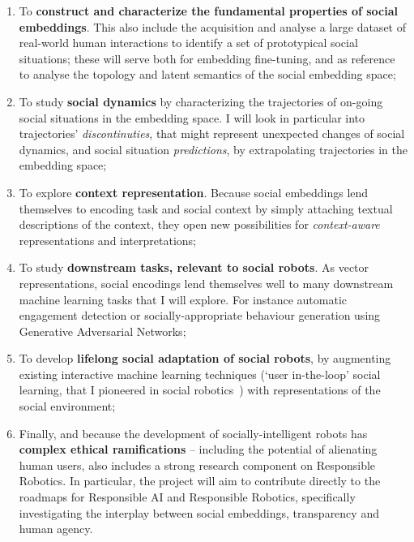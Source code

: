 \begin{enumerate}[label=\textbf{O\arabic*}]
    \item \label{T1} To \textbf{construct and characterize the fundamental
        properties of social embeddings}. This also include the acquisition and
        analyse a large dataset of real-world human interactions to identify a
        set of prototypical social situations; these will serve both for
        embedding fine-tuning, and as reference to analyse the topology and
        latent semantics of the social embedding space;

    \item \label{T2} To study \textbf{social dynamics} by characterizing the
        trajectories of on-going social situations in the embedding space. I
        will look in particular into trajectories' \emph{discontinuties}, that
        might represent unexpected changes of social dynamics, and social
        situation \emph{predictions}, by extrapolating trajectories in the embedding
        space;

    \item \label{T5} To explore \textbf{context representation}. Because social
        embeddings lend themselves to encoding task and social context by
        simply attaching textual descriptions of the context, they open new
        possibilities for \emph{context-aware} representations and
        interpretations;

    \item \label{T3} To study \textbf{downstream tasks, relevant to social
        robots}. As vector representations, social encodings lend themselves
        well to many downstream machine learning tasks that I will explore. For
        instance automatic engagement detection or socially-appropriate
        behaviour generation using Generative Adversarial Networks;

    \item \label{T4} To develop \textbf{lifelong social adaptation of social
        robots}, by augmenting existing interactive machine learning techniques
        (`user in-the-loop' social learning, that I pioneered in social
        robotics~\cite{senft2017supervised, winkle2020couch,winkle2021leador})
        with representations of the social environment;

    \item \label{T6} Finally, and because the development of
        socially-intelligent robots has \textbf{complex ethical ramifications}
        -- including the potential of alienating human users, \project also
        includes a strong research component on Responsible Robotics. In
        particular, the project will aim to contribute directly to the roadmaps
        for Responsible AI and Responsible Robotics, specifically investigating
        the interplay between social embeddings, transparency and human agency.

\end{enumerate}


